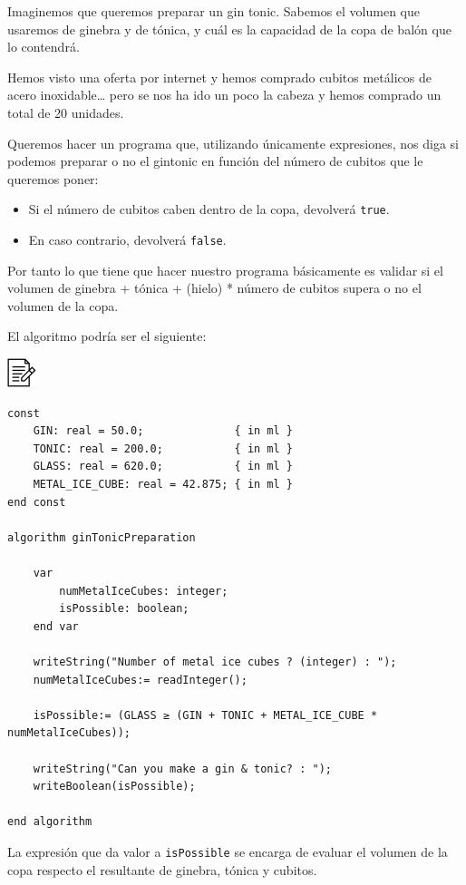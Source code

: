 \documentclass[
]{book}
\providecommand{\tightlist}{%
  \setlength{\itemsep}{0pt}\setlength{\parskip}{0pt}}
\begin{document}
Imaginemos que queremos preparar un gin tonic. Sabemos el volumen que usaremos de ginebra y de tónica, y cuál es la capacidad de la copa de balón que lo contendrá.

Hemos visto una oferta por internet y hemos comprado cubitos metálicos de acero inoxidable\ldots{} pero se nos ha ido un poco la cabeza y hemos comprado un total de 20 unidades.

Queremos hacer un programa que, utilizando únicamente expresiones, nos diga si podemos preparar o no el gintonic en función del número de cubitos que le queremos poner:

\begin{itemize}
\tightlist
\item
  Si el número de cubitos caben dentro de la copa, devolverá \texttt{true}.
\item
  En caso contrario, devolverá \texttt{false}.
\end{itemize}

Por tanto lo que tiene que hacer nuestro programa básicamente es validar si el volumen de ginebra + tónica + (hielo) * número de cubitos supera o no el volumen de la copa.

El algoritmo podría ser el siguiente:

\includegraphics{./img/alg.png}

\begin{verbatim}
const
    GIN: real = 50.0;              { in ml }
    TONIC: real = 200.0;           { in ml }
    GLASS: real = 620.0;           { in ml }
    METAL_ICE_CUBE: real = 42.875; { in ml }
end const

algorithm ginTonicPreparation

    var
        numMetalIceCubes: integer;
        isPossible: boolean;
    end var

    writeString("Number of metal ice cubes ? (integer) : ");
    numMetalIceCubes:= readInteger();

    isPossible:= (GLASS ≥ (GIN + TONIC + METAL_ICE_CUBE * numMetalIceCubes));

    writeString("Can you make a gin & tonic? : ");
    writeBoolean(isPossible);

end algorithm
\end{verbatim}

La expresión que da valor a \texttt{isPossible} se encarga de evaluar el volumen de la copa respecto el resultante de ginebra, tónica y cubitos.
\end{document}
